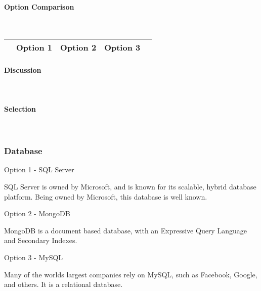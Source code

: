 \documentclass[letterpaper, 10pt, draftclsnofoot, compsoc, onecolumn]{IEEEtran}
\begin{document}
{{ \par}


\newpage
\paragraph{Option Comparison} ~\\
\tablehead{}
\begin{supertabular}{|p{2cm}|p{2.5cm}|p{2.5cm}|p{2.5cm}|p{2.5cm}|}
\hline & Option 1 & Option 2 & Option 3\\ \hline
\end{supertabular}

\newpage
\paragraph{Discussion} ~\\
{\noindent  \par}

\medskip
\paragraph{Selection} ~\\
{\noindent \par}

\medskip

\newpage
\subsubsection{Database}
{\noindent Option 1 - SQL Server \par}
{\noindent SQL Server is owned by Microsoft, and is known for its scalable, hybrid database platform. Being owned by Microsoft, this database is well known. \cite{SQLServer} \par}

\medskip
{\noindent Option 2 - MongoDB \par}
{\noindent MongoDB is a document based database, with an Expressive Query Language and Secondary Indexes. \cite{MongoDB}  \par}

\medskip
{\noindent Option 3 - MySQL \par}
{\noindent Many of the worlds largest companies rely on MySQL, such as Facebook, Google, and others. It is a relational database. \cite{MySQL}  \par}

\medskip
}
\end{document}
